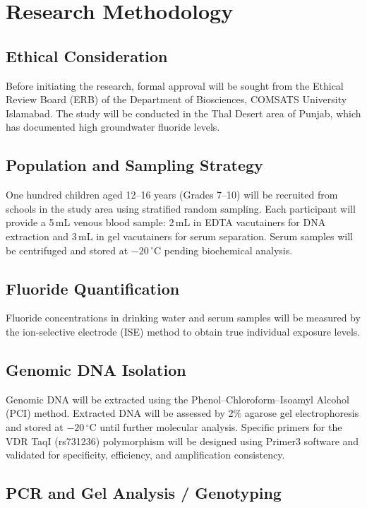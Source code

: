 \documentclass[12pt,a4paper]{article}
\begin{document}
\section{Research Methodology}

\subsection{Ethical Consideration}

Before initiating the research, formal approval will be sought from the Ethical Review Board (ERB)
of the Department of Biosciences, COMSATS University Islamabad. The study will be conducted in
the Thal Desert area of Punjab, which has documented high groundwater fluoride levels.

\subsection{Population and Sampling Strategy}

One hundred children aged 12--16 years (Grades 7--10) will be recruited from schools in the study
area using stratified random sampling. Each participant will provide a 5\,mL venous blood sample:
2\,mL in EDTA vacutainers for DNA extraction and 3\,mL in gel vacutainers for serum separation.
Serum samples will be centrifuged and stored at $-20\,^\circ$C pending biochemical analysis.

\subsection{Fluoride Quantification}

Fluoride concentrations in drinking water and serum samples will be measured by the
ion-selective electrode (ISE) method to obtain true individual exposure levels.

\subsection{Genomic DNA Isolation}

Genomic DNA will be extracted using the Phenol--Chloroform--Isoamyl Alcohol (PCI) method.
Extracted DNA will be assessed by 2\% agarose gel electrophoresis and stored at $-20\,^\circ$C
until further molecular analysis. Specific primers for the VDR TaqI (rs731236) polymorphism
will be designed using Primer3 software and validated for specificity, efficiency, and amplification
consistency.

\subsection{PCR and Gel Analysis / Genotyping}
\end{document}
